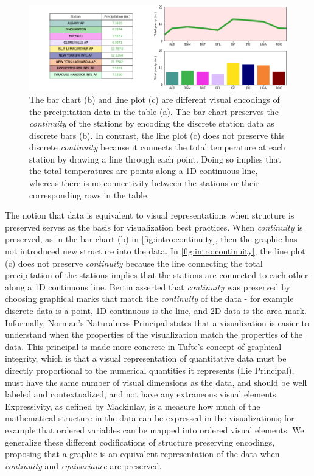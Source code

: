\documentclass[../main.tex]{subfiles}
\begin{document}
\begin{figure}[H]
    \includegraphics[width=1\textwidth]{figures/intro/continuity.png}
    \caption{The bar chart (b) and line plot (c) are different visual encodings of the precipitation data in the table (a). The bar chart preserves the \textit{continuity} of the stations by encoding the discrete station data as discrete bars (b). In contrast, the line plot (c) does not preserve this discrete \textit{continuity} because it connects the total temperature at each station by drawing a line through each point. Doing so implies that the total temperatures are points along a 1D continuous line, whereas there is no connectivity between the stations or their corresponding rows in the table.}
    \label{fig:intro:continuity}
\end{figure}
The notion that data is equivalent to visual representations when structure is preserved serves as the basis for visualization best practices. When \textit{continuity} is preserved, as in the bar chart (b) in \autoref{fig:intro:continuity}, then the graphic has not introduced new structure into the data.  In \autoref{fig:intro:continuity}, the line plot (c) does not preserve \textit{continuity} because the line connecting the total precipitation of the stations implies that the stations are connected to each other along a 1D continuous line. Bertin asserted that \textit{continuity} was preserved by choosing graphical marks that match the \textit{continuity} of the data - for example discrete data is a point, 1D continuous is the line, and 2D data is the area mark. Informally, Norman's Naturalness Principal\cite{NaturalnessPrincipleInfoVis} states that a visualization is easier to understand when the properties of the visualization match the properties of the data. This principal is made more concrete in Tufte's concept of graphical integrity, which is that a visual representation of quantitative data must be directly proportional to the numerical quantities it represents (Lie Principal), must have the same number of visual dimensions as the data, and should be well labeled and contextualized, and not have any extraneous visual elements\cite{tufteVisualDisplayQuantitative2001}. Expressivity, as defined by Mackinlay, is a measure how much of the mathematical structure in the data can be expressed in the visualizations; for example that ordered variables can be mapped into ordered visual elements. We generalize these different codifications of structure preserving encodings, proposing that a graphic is an equivalent representation of the data when \textit{continuity} and \textit{equivariance} are preserved.
\end{document}
